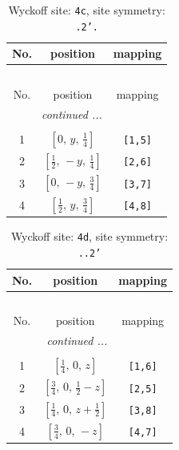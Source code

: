 \documentclass[fleqn,8pt]{jsarticle}
\begin{document}
\renewcommand{\arraystretch}{1.2}
\begin{longtable}{ccc}
\caption{Wyckoff site: {\tt 4c}, site symmetry: {\tt .2'.}}
 \\
 \hline \hline
No. & position & mapping \\ \hline \endfirsthead

\multicolumn{2}{l}{\tablename\ \thetable{}} \\
 \hline \hline
No. & position & mapping \\ \hline \endhead

 \hline \hline
\multicolumn{2}{r}{\footnotesize\it continued ...} \\ \endfoot

 \hline \hline
\multicolumn{2}{r}{} \\ \endlastfoot

1 & $\left[ 0,\, y,\, \frac{1}{4} \right]$ & {\tt [1,5]} \\ \hline
2 & $\left[ \frac{1}{2},\, - y,\, \frac{1}{4} \right]$ & {\tt [2,6]} \\ \hline
3 & $\left[ 0,\, - y,\, \frac{3}{4} \right]$ & {\tt [3,7]} \\ \hline
4 & $\left[ \frac{1}{2},\, y,\, \frac{3}{4} \right]$ & {\tt [4,8]} \\
\end{longtable}
\renewcommand{\arraystretch}{1.2}
\begin{longtable}{ccc}
\caption{Wyckoff site: {\tt 4d}, site symmetry: {\tt ..2'}}
 \\
 \hline \hline
No. & position & mapping \\ \hline \endfirsthead

\multicolumn{2}{l}{\tablename\ \thetable{}} \\
 \hline \hline
No. & position & mapping \\ \hline \endhead

 \hline \hline
\multicolumn{2}{r}{\footnotesize\it continued ...} \\ \endfoot

 \hline \hline
\multicolumn{2}{r}{} \\ \endlastfoot

1 & $\left[ \frac{1}{4},\, 0,\, z \right]$ & {\tt [1,6]} \\ \hline
2 & $\left[ \frac{3}{4},\, 0,\, \frac{1}{2} - z \right]$ & {\tt [2,5]} \\ \hline
3 & $\left[ \frac{1}{4},\, 0,\, z + \frac{1}{2} \right]$ & {\tt [3,8]} \\ \hline
4 & $\left[ \frac{3}{4},\, 0,\, - z \right]$ & {\tt [4,7]} \\
\end{longtable}
\end{document}

